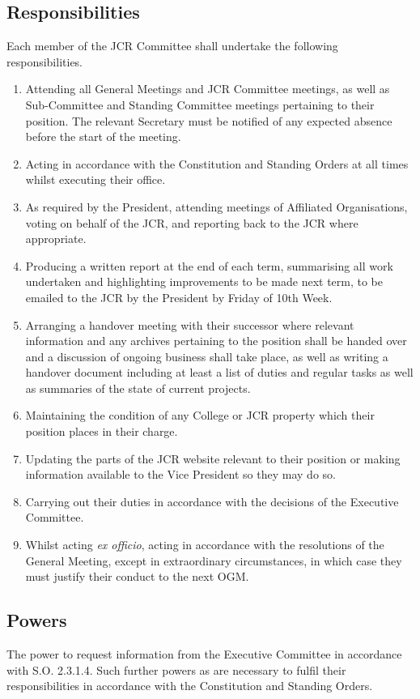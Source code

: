 \subsection{Responsibilities}
\npara Each member of the JCR Committee shall undertake the following responsibilities.
\begin{enumerate}
	\item Attending all General Meetings and JCR Committee meetings, as well as Sub-Committee and Standing Committee meetings pertaining to their position. The relevant Secretary must be notified of any expected absence before the start of the meeting.
	\item Acting in accordance with the Constitution and Standing Orders at all times whilst executing their office.
	\item As required by the President, attending meetings of Affiliated Organisations, voting on behalf of the JCR, and reporting back to the JCR where appropriate.
	\item Producing a written report at the end of each term, summarising all work undertaken and highlighting improvements to be made next term, to be emailed to the JCR by the President by Friday of 10th Week.
	\item Arranging a handover meeting with their successor where relevant information and any archives pertaining to the position shall be handed over and a discussion of ongoing business shall take place, as well as writing a handover document including at least a list of duties and regular tasks as well as summaries of the state of current projects.
	\item Maintaining the condition of any College or JCR property which their position places in their charge.
	\item Updating the parts of the JCR website relevant to their position or making information available to the Vice President so they may do so.
	\item Carrying out their duties in accordance with the decisions of the Executive Committee.
	\item Whilst acting \textit{ex officio}, acting in accordance with the resolutions of the General Meeting, except in extraordinary circumstances, in which case they must justify their conduct to the next OGM.
\end{enumerate}
\subsection{Powers}
\npara The power to request information from the Executive Committee in accordance with S.O. 2.3.1.4.
\npara Such further powers as are necessary to fulfil their responsibilities in accordance with the Constitution and Standing Orders.
